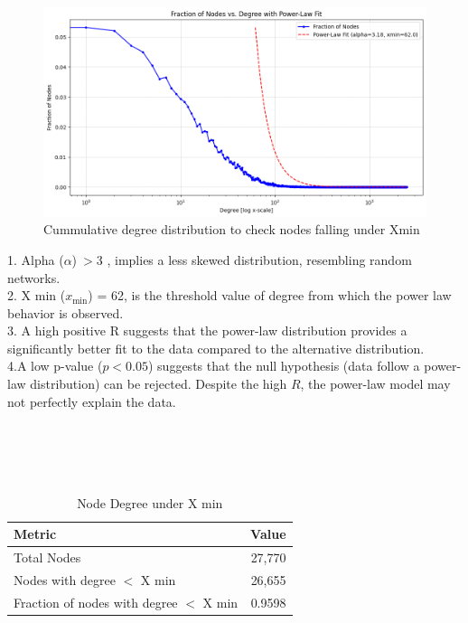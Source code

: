 \documentclass{article}
\begin{document}
\begin{figure}[h]
    \centering
    \includegraphics[width=\textwidth]{Figures/Power Law Fit.png}
    \caption{Cummulative degree distribution to check nodes falling under Xmin}
    \label{fig:network_graph}
\end{figure}

1. Alpha ($\alpha$)$\>>$3 , implies a less skewed distribution, resembling random networks.\\
2. X min ($x_{\text{min}}$) = 62, is the threshold value of degree from which the power law behavior is observed.\\
3. A high positive R suggests that the power-law distribution provides a significantly better fit to the data compared to the alternative distribution.\\
4.A low p-value ($p < 0.05$) suggests that the null hypothesis (data follow a power-law distribution) can be rejected. Despite the high $R$, the power-law model may not perfectly explain the data.\\\\\\\\\

\begin{table}[h]
    \centering
    \begin{tabular}{lr}
        \hline
        \textbf{Metric} & \textbf{Value} \\
        \hline
        Total Nodes & 27,770 \\
        Nodes with degree $<$ X min & 26,655 \\
        Fraction of nodes with degree $<$ X min & 0.9598 \\
        \hline
    \end{tabular}
    \caption{Node Degree under X min}
    \label{tab:node_degree_info}
\end{table}
\end{document}
